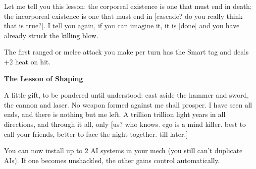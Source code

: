 Let me tell you this lesson: the corporeal existence is one that must end in death; the incorporeal existence is one that must end in [cascade? do you really think that is true?]. I tell you again, if you can imagine it, it is [done] and you have already struck the killing blow.

The first ranged or melee attack you make per turn has the Smart tag and deals +2 heat on hit.


\textbf{The Lesson of Shaping}

A little gift, to be pondered until understood: cast aside the hammer and sword, the cannon and laser. No weapon formed against me shall prosper. I have seen all ends, and there is nothing but me left. A trillion trillion light years in all directions, and through it all, only [us? who knows. ego is a mind killer. best to call your friends, better to face the night together. till later.]

You can now install up to 2 AI systems in your mech (you still can't duplicate AIs). If one becomes unshackled, the other gains control automatically.


